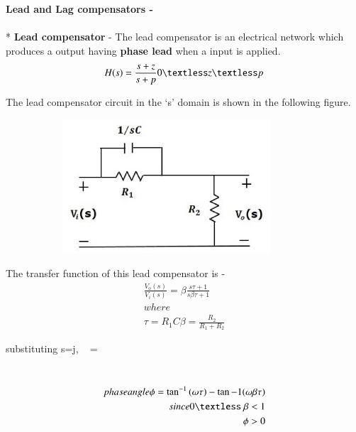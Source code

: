 \begin{enumerate}[label=\thesection.\arabic*.,ref=\thesection.\theenumi]
\begin{flushleft}
\textbf{Lead and Lag compensators -}
\\
\\* \textbf{Lead compensator } - The lead compensator is an electrical network which produces a output having \textbf{phase lead} when a input is applied. 
\\
\begin{equation}
H(s) = \frac{s+z}{s+p}   0 \textless z \textless p
\centering
\end{equation}


 
The lead compensator circuit in the ‘s’ domain is shown in the following figure.
 
\begin{figure}[h]
 
\begin{subfigure}{0.5\textwidth}
\includegraphics[width=0.9\linewidth, height=5cm ,inner]{./figs/ee18btech11027/lead_compensator.eps} 
\label{fig:subim1}
\end{subfigure}
\end{figure}


 
The transfer function of this lead compensator is -
\begin{align}
    \frac{V_o(s)}{V_i(s)} = \beta  \frac{s \tau +1}{s\beta \tau +1} \\
where\\
\tau = R_1C  \beta =\frac{R_2}{R_1+R_2}
\end{align}

\vspace{0.3cm}substituting s=j\omega, \  = \beta  {}

\\
\begin{align}
phase angle \phi = \tan^{-1} {(\omega\tau)} - \tan{-1}{(\omega\beta\tau)}\\
since 0 \textless \ \beta < 1\\
\phi > 0
\end{align}


\end{flushleft}
\end{enumerate}
